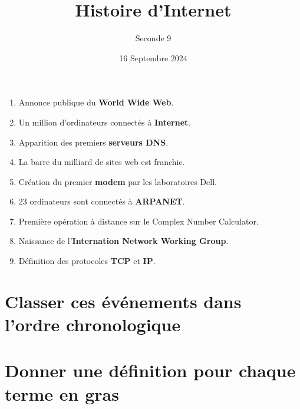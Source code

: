 \documentclass{article}
\title{Histoire d'Internet}
\date{16 Septembre 2024}
\author{Seconde 9}
\begin{document}
\maketitle

\begin{enumerate}
    \item Annonce publique du \textbf{World Wide Web}.
    \item Un million d'ordinateurs connectés à \textbf{Internet}.
    \item Apparition des premiers \textbf{serveurs DNS}.
    \item La barre du milliard de sites web est franchie.
    \item Création du premier \textbf{modem} par les laboratoires Dell. 
    \item 23 ordinateurs sont connectés à \textbf{ARPANET}.
    \item Première opération à distance sur le Complex Number Calculator.
    \item Naissance de l'\textbf{Internation Network Working Group}.
    \item Définition des protocoles \textbf{TCP} et \textbf{IP}.
\end{enumerate}
\vspace{1cm}
\begin{minipage}{0.45\textwidth}
\section{Classer ces événements dans l'ordre chronologique}
\emptybox{12cm}
\end{minipage}
\hfill\vline\hfill
\begin{minipage}{0.45\textwidth}
\section{Donner une définition pour chaque terme en gras}
\emptybox{12cm}
\end{minipage}
\end{document}
